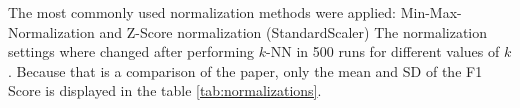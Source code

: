The most commonly used normalization methods were applied: Min-Max-Normalization and Z-Score normalization (StandardScaler)
The normalization settings where changed after performing $k$-NN in 500 runs for different values of $k$.
Because that is a comparison of the paper, only the mean and SD of the F1 Score is displayed in the table \ref{tab:normalizations}.




































